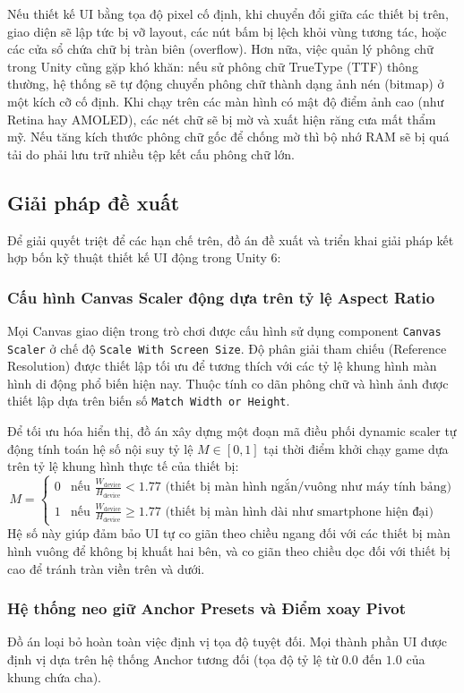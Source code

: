 \documentclass[../Project.tex]{subfiles}
\begin{document}
Nếu thiết kế UI bằng tọa độ pixel cố định, khi chuyển đổi giữa các thiết bị trên, giao diện sẽ lập tức bị vỡ layout, các nút bấm bị lệch khỏi vùng tương tác, hoặc các cửa sổ chứa chữ bị tràn biên (overflow). Hơn nữa, việc quản lý phông chữ trong Unity cũng gặp khó khăn: nếu sử phông chữ TrueType (TTF) thông thường, hệ thống sẽ tự động chuyển phông chữ thành dạng ảnh nén (bitmap) ở một kích cỡ cố định. Khi chạy trên các màn hình có mật độ điểm ảnh cao (như Retina hay AMOLED), các nét chữ sẽ bị mờ và xuất hiện răng cưa mất thẩm mỹ. Nếu tăng kích thước phông chữ gốc để chống mờ thì bộ nhớ RAM sẽ bị quá tải do phải lưu trữ nhiều tệp kết cấu phông chữ lớn.

\subsection{Giải pháp đề xuất}
Để giải quyết triệt để các hạn chế trên, đồ án đề xuất và triển khai giải pháp kết hợp bốn kỹ thuật thiết kế UI động trong Unity 6:

\subsubsection{Cấu hình Canvas Scaler động dựa trên tỷ lệ Aspect Ratio}
Mọi Canvas giao diện trong trò chơi được cấu hình sử dụng component \texttt{Canvas Scaler} ở chế độ \texttt{Scale With Screen Size}. Độ phân giải tham chiếu (Reference Resolution) được thiết lập tối ưu để tương thích với các tỷ lệ khung hình màn hình di động phổ biến hiện nay. Thuộc tính co dãn phông chữ và hình ảnh được thiết lập dựa trên biến số \texttt{Match Width or Height}. 

Để tối ưu hóa hiển thị, đồ án xây dựng một đoạn mã điều phối dynamic scaler tự động tính toán hệ số nội suy tỷ lệ \(M \in [0, 1]\) tại thời điểm khởi chạy game dựa trên tỷ lệ khung hình thực tế của thiết bị:
\[ M = \begin{cases} 
  0 & \text{nếu } \frac{W_{\text{device}}}{H_{\text{device}}} < 1.77 \text{ (thiết bị màn hình ngắn/vuông như máy tính bảng)} \\
  1 & \text{nếu } \frac{W_{\text{device}}}{H_{\text{device}}} \ge 1.77 \text{ (thiết bị màn hình dài như smartphone hiện đại)}
\end{cases} \]
Hệ số này giúp đảm bảo UI tự co giãn theo chiều ngang đối với các thiết bị màn hình vuông để không bị khuất hai bên, và co giãn theo chiều dọc đối với thiết bị cao để tránh tràn viền trên và dưới.

\subsubsection{Hệ thống neo giữ Anchor Presets và Điểm xoay Pivot}
Đồ án loại bỏ hoàn toàn việc định vị tọa độ tuyệt đối. Mọi thành phần UI được định vị dựa trên hệ thống Anchor tương đối (tọa độ tỷ lệ từ \(0.0\) đến \(1.0\) của khung chứa cha). 
\end{document}
